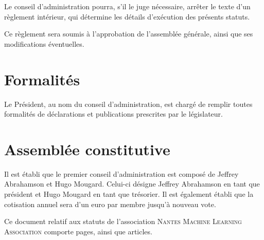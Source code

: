 \documentclass[12 pt]{article}
\newcommand{\Nom}{\textsc{Nantes Machine Learning Association}}
\begin{document}
Le conseil d'administration pourra, s'il le juge nécessaire, arrêter
le texte d'un règlement intérieur, qui détermine les détails
d'exécution des présents statuts.

Ce règlement sera soumis à l'approbation de l'assemblée générale,
ainsi que ses modifications éventuelles.

\section{Formalités}
\label{sec:formalites}

Le Président, au nom du conseil d'administration, est chargé de remplir toutes formalités de déclarations et publications prescrites par le législateur.

\section{Assemblée constitutive}

Il est établi que le premier conseil d'administration est composé de
Jeffrey Abrahamson et Hugo Mougard.  Celui-ci désigne Jeffrey
Abrahamson en tant que président et Hugo Mougard en tant que trésorier.  Il est
également établi que la cotisation annuel sera d'un euro par membre jusqu'à
nouveau vote.


\bigskip

Ce document relatif aux statuts de l'association \Nom{} comporte
\pageref{LastPage} pages, ainsi que  articles.

\end{document}
